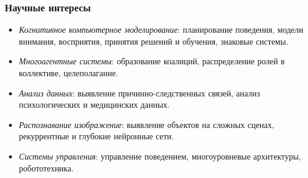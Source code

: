 \documentclass[default]{beamer}
\begin{document}
	\begin{frame}
		\frametitle{Научные интересы}
		
		\begin{itemize}
			\item \textit{Когнитивное компьютерное моделирование}: планирование поведения, модели внимания, восприятия, принятия решений и обучения, знаковые системы.
			\item \textit{Многоагентные системы}: образование коалиций, распределение ролей в коллективе, целеполагание.
			\item \textit{Анализ данных}: выявление причинно-следственных связей, анализ психологических и медицинских данных.
			\item \textit{Распознавание изображение}: выявление объектов на сложных сценах, рекуррентные и глубокие нейронные сети.
			\item \textit{Системы управления}: управление поведением, многоуровневые архитектуры, робототехника.
		\end{itemize}
	\end{frame}
	
\end{document}
